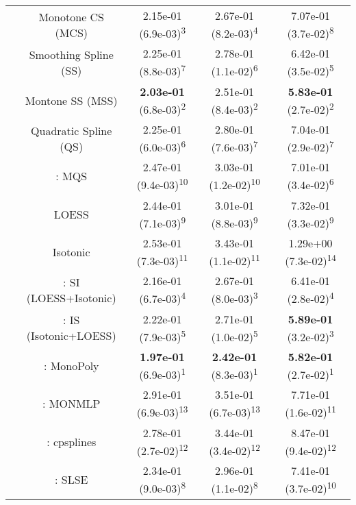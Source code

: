 \begin{tabular}{ccccc}
&Monotone CS (MCS)& 2.15e-01 (6.9e-03)\textsuperscript{3}& 2.67e-01 (8.2e-03)\textsuperscript{4}& 7.07e-01 (3.7e-02)\textsuperscript{8}\tabularnewline
&Smoothing Spline (SS)& 2.25e-01 (8.8e-03)\textsuperscript{7}& 2.78e-01 (1.1e-02)\textsuperscript{6}& 6.42e-01 (3.5e-02)\textsuperscript{5}\tabularnewline
&Montone SS (MSS)& \textbf{2.03e-01} (6.8e-03)\textsuperscript{2}& 2.51e-01 (8.4e-03)\textsuperscript{2}& \textbf{5.83e-01} (2.7e-02)\textsuperscript{2}\tabularnewline
&Quadratic Spline (QS)& 2.25e-01 (6.0e-03)\textsuperscript{6}& 2.80e-01 (7.6e-03)\textsuperscript{7}& 7.04e-01 (2.9e-02)\textsuperscript{7}\tabularnewline
&\textcite{heMonotoneBsplineSmoothing1998}: MQS& 2.47e-01 (9.4e-03)\textsuperscript{10}& 3.03e-01 (1.2e-02)\textsuperscript{10}& 7.01e-01 (3.4e-02)\textsuperscript{6}\tabularnewline
&LOESS& 2.44e-01 (7.1e-03)\textsuperscript{9}& 3.01e-01 (8.8e-03)\textsuperscript{9}& 7.32e-01 (3.3e-02)\textsuperscript{9}\tabularnewline
&Isotonic& 2.53e-01 (7.3e-03)\textsuperscript{11}& 3.43e-01 (1.1e-02)\textsuperscript{11}& 1.29e+00 (7.3e-02)\textsuperscript{14}\tabularnewline
&\textcite{mammenEstimatingSmoothMonotone1991}: SI (LOESS+Isotonic)& 2.16e-01 (6.7e-03)\textsuperscript{4}& 2.67e-01 (8.0e-03)\textsuperscript{3}& 6.41e-01 (2.8e-02)\textsuperscript{4}\tabularnewline
&\textcite{mammenEstimatingSmoothMonotone1991}: IS (Isotonic+LOESS)& 2.22e-01 (7.9e-03)\textsuperscript{5}& 2.71e-01 (1.0e-02)\textsuperscript{5}& \textbf{5.89e-01} (3.2e-02)\textsuperscript{3}\tabularnewline
&\textcite{murrayFastFlexibleMethods2016a}: MonoPoly& \textbf{1.97e-01} (6.9e-03)\textsuperscript{1}& \textbf{2.42e-01} (8.3e-03)\textsuperscript{1}& \textbf{5.82e-01} (2.7e-02)\textsuperscript{1}\tabularnewline
&\textcite{cannonMonmlpMultilayerPerceptron2017}: MONMLP& 2.91e-01 (6.9e-03)\textsuperscript{13}& 3.51e-01 (6.7e-03)\textsuperscript{13}& 7.71e-01 (1.6e-02)\textsuperscript{11}\tabularnewline
&\textcite{navarro-garciaConstrainedSmoothingOutofrange2023}: cpsplines& 2.78e-01 (2.7e-02)\textsuperscript{12}& 3.44e-01 (3.4e-02)\textsuperscript{12}& 8.47e-01 (9.4e-02)\textsuperscript{12}\tabularnewline
&\textcite{groeneboomConfidenceIntervalsMonotone2023}: SLSE& 2.34e-01 (9.0e-03)\textsuperscript{8}& 2.96e-01 (1.1e-02)\textsuperscript{8}& 7.41e-01 (3.7e-02)\textsuperscript{10}\tabularnewline
\bottomrule
\end{tabular}
